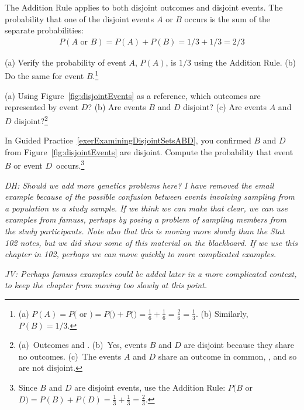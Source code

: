 \begin{doublespace}
The Addition Rule applies to both disjoint outcomes and disjoint events. The probability that one of the disjoint events $A$ or $B$ occurs is the sum of the separate probabilities:
\begin{align*}
P(A\text{ or }B) = P(A) + P(B) = 1/3 + 1/3 = 2/3
\end{align*}

\begin{exercise}
(a) Verify the probability of event $A$, $P(A)$, is $1/3$ using the Addition Rule. (b) Do the same for event $B$.\footnote{(a) $P(A) = P($ or $) = P($$) + P($$) = \frac{1}{6} + \frac{1}{6} = \frac{2}{6} = \frac{1}{3}$. (b) Similarly, $P(B) = 1/3$.}
\end{exercise}

\begin{exercise} \label{exerExaminingDisjointSetsABD}
(a) Using Figure~\ref{fig:disjointEvents} as a reference, which outcomes are represented by event $D$? (b) Are events $B$ and $D$ disjoint? (c) Are events $A$ and $D$ disjoint?\footnote{(a)~Outcomes  and . (b)~Yes, events $B$ and $D$ are disjoint because they share no outcomes. (c)~The events $A$ and $D$ share an outcome in common, , and so are not disjoint.}
\end{exercise}

\begin{exercise}
In Guided Practice~\ref{exerExaminingDisjointSetsABD}, you confirmed $B$ and $D$ from Figure~\ref{fig:disjointEvents} are disjoint. Compute the probability that event $B$ or event $D$~occurs.\footnote{Since $B$ and $D$ are disjoint events, use the Addition Rule: $P(B$ or $D) = P(B) + P(D) = \frac{1}{3} + \frac{1}{3} = \frac{2}{3}$.}
\end{exercise}

\textit{DH: Should we add more genetics problems here?  I have removed the email example because of the possible confusion between events involving sampling from a population vs a study sample.  If we think we can make that clear, we can use examples from famuss, perhaps by posing a problem of sampling members from the study participants.  Note also that this is moving more slowly than the Stat 102 notes, but we did show some of this material on the blackboard. If we use this chapter in 102, perhaps we can move quickly to more complicated examples.}

\textit{JV: Perhaps famuss examples could be added later in a more complicated context, to keep the chapter from moving too slowly at this point.}


\end{doublespace}
